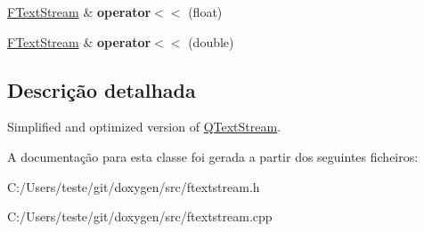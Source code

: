 \begin{DoxyCompactItemize}
\item 
\hypertarget{class_f_text_stream_a04008619eb6be1fe4de2bf3479d8190a}{\hyperlink{class_f_text_stream}{F\-Text\-Stream} \& {\bfseries operator$<$$<$} (float)}\label{class_f_text_stream_a04008619eb6be1fe4de2bf3479d8190a}

\item 
\hypertarget{class_f_text_stream_a8d893f90c3bb35af43d973c75866a138}{\hyperlink{class_f_text_stream}{F\-Text\-Stream} \& {\bfseries operator$<$$<$} (double)}\label{class_f_text_stream_a8d893f90c3bb35af43d973c75866a138}

\end{DoxyCompactItemize}


\subsection{Descrição detalhada}
Simplified and optimized version of \hyperlink{class_q_text_stream}{Q\-Text\-Stream}. 

A documentação para esta classe foi gerada a partir dos seguintes ficheiros\-:\begin{DoxyCompactItemize}
\item 
C\-:/\-Users/teste/git/doxygen/src/ftextstream.\-h\item 
C\-:/\-Users/teste/git/doxygen/src/ftextstream.\-cpp\end{DoxyCompactItemize}
